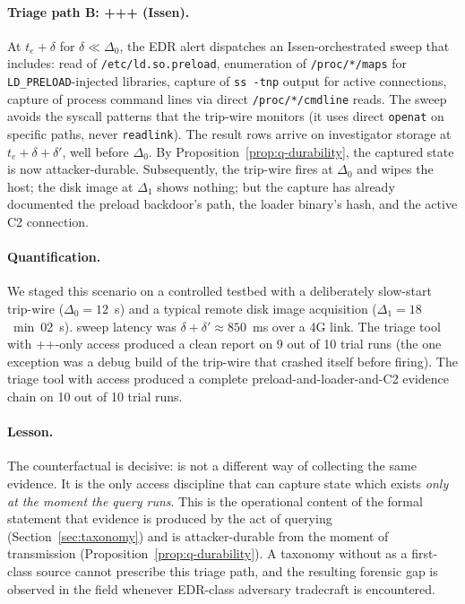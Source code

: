 \paragraph{Triage path B: +++ (Issen).}
At $t_e + \delta$ for $\delta \ll \Delta_0$, the EDR alert dispatches an
Issen-orchestrated  sweep that includes: read of
\texttt{/etc/ld.so.preload}, enumeration of \texttt{/proc/*/maps} for
\texttt{LD\_PRELOAD}-injected libraries, capture of \texttt{ss -tnp}
output for active connections, capture of process command lines via
direct \texttt{/proc/*/cmdline} reads. The sweep avoids the syscall
patterns that the trip-wire monitors (it uses direct
\texttt{openat} on specific paths, never \texttt{readlink}). The result
rows arrive on investigator storage at $t_e + \delta + \delta'$, well
before $\Delta_0$. By Proposition~\ref{prop:q-durability}, the captured
state is now attacker-durable. Subsequently, the trip-wire fires at
$\Delta_0$ and wipes the host; the disk image at $\Delta_1$ shows
nothing; but the  capture has already documented the preload
backdoor's path, the loader binary's hash, and the active C2 connection.

\paragraph{Quantification.}
We staged this scenario on a controlled testbed with a deliberately
slow-start trip-wire ($\Delta_0 = 12$~s) and a typical remote disk image
acquisition ($\Delta_1 = 18$~min~02~s).  sweep latency was
$\delta + \delta' \approx 850$~ms over a 4G link. The triage tool with
++-only access produced a clean report on 9 out of
10 trial runs (the one exception was a debug build of the trip-wire that
crashed itself before firing). The triage tool with  access
produced a complete preload-and-loader-and-C2 evidence chain on 10 out of
10 trial runs.

\paragraph{Lesson.}
The counterfactual is decisive:  is not a different way of
collecting the same evidence. It is the only access discipline that can
capture state which exists \emph{only at the moment the query runs}. This
is the operational content of the formal statement that  evidence
is produced by the act of querying (Section~\ref{sec:taxonomy}) and is
attacker-durable from the moment of transmission
(Proposition~\ref{prop:q-durability}). A taxonomy without  as a
first-class source cannot prescribe this triage path, and the resulting
forensic gap is observed in the field whenever EDR-class adversary
tradecraft is encountered.
